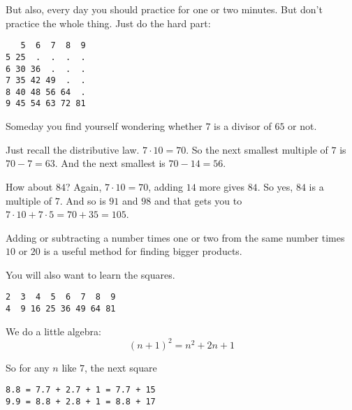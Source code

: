 \documentclass[11pt, oneside]{article}
\begin{document}
But also, every day you should practice for one or two minutes.  But don't practice the whole thing.  Just do the hard part:

\begin{verbatim}
   5  6  7  8  9
5 25  .  .  .  .
6 30 36  .  .  .
7 35 42 49  .  .
8 40 48 56 64  .
9 45 54 63 72 81
\end{verbatim}

Someday you find yourself wondering whether $7$ is a divisor of $65$ or not.

Just recall the distributive law.  $7 \cdot 10 = 70$.  So the next smallest multiple of $7$ is $70 - 7 = 63$.  And the next smallest is $70 - 14 = 56$.

How about $84$?  Again, $7 \cdot 10 = 70$, adding $14$ more gives $84$.  So yes, $84$ is a multiple of $7$.  And so is $91$ and $98$ and that gets you to $7 \cdot 10 + 7 \cdot 5 = 70 + 35 = 105$.

Adding or subtracting a number times one or two from the same number times $10$ or $20$ is a useful method for finding bigger products.

You will also want to learn the squares.

\begin{verbatim}
2  3  4  5  6  7  8  9
4  9 16 25 36 49 64 81 
\end{verbatim}

We do a little algebra:
\[ (n + 1)^2 = n^2 + 2n + 1 \]

So for any $n$ like $7$, the next square

\begin{verbatim}
8.8 = 7.7 + 2.7 + 1 = 7.7 + 15
9.9 = 8.8 + 2.8 + 1 = 8.8 + 17
\end{verbatim}
\end{document}
